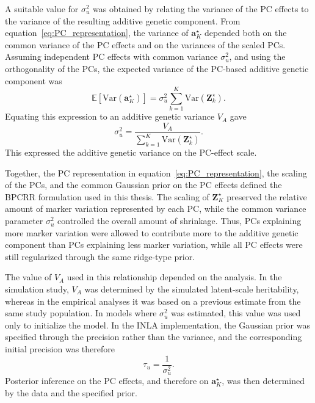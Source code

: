 A suitable value for $\sigma_u^2$ was obtained by relating the variance of the PC effects to the variance of the resulting additive genetic component. From equation~\eqref{eq:PC_representation}, the variance of $\mathbf{a}_K^\star$ depended both on the common variance of the PC effects and on the variances of the scaled PCs. Assuming independent PC effects with common variance $\sigma_u^2$, and using the orthogonality of the PCs, the expected variance of the PC-based additive genetic component was
%
\[
\mathbb{E}\left[\mathrm{Var}(\mathbf{a}_K^\star)\right]
=
\sigma_u^2
\sum_{k=1}^K \mathrm{Var}(\mathbf{Z}_k^\star).
\]
%
Equating this expression to an additive genetic variance $V_A$ gave
%
\begin{equation}
\sigma^2_u =
\frac{V_A}
{\sum_{k=1}^K \mathrm{Var}(\mathbf{Z}_k^\star)} .
\label{eq:scaling_sigma_u}
\end{equation}
%
This expressed the additive genetic variance on the PC-effect scale. %

Together, the PC representation in equation~\eqref{eq:PC_representation}, the scaling of the PCs, and the common Gaussian prior on the PC effects defined the BPCRR formulation used in this thesis. The scaling of $\mathbf{Z}_K^\star$ preserved the relative amount of marker variation represented by each PC, while the common variance parameter $\sigma_u^2$ controlled the overall amount of shrinkage. Thus, PCs explaining more marker variation were allowed to contribute more to the additive genetic component than PCs explaining less marker variation, while all PC effects were still regularized through the same ridge-type prior.

The value of $V_A$ used in this relationship depended on the analysis. In the simulation study, $V_A$ was determined by the simulated latent-scale heritability, whereas in the empirical analyses it was based on a previous estimate from the same study population. In models where $\sigma_u^2$ was estimated, this value was used only to initialize the model. In the INLA implementation, the Gaussian prior was specified through the precision rather than the variance, and the corresponding initial precision was therefore
%
\[
\tau_u = \frac{1}{\sigma_u^2}.
\]
%
Posterior inference on the PC effects, and therefore on $\mathbf{a}_K^\star$, was then determined by the data and the specified prior.

